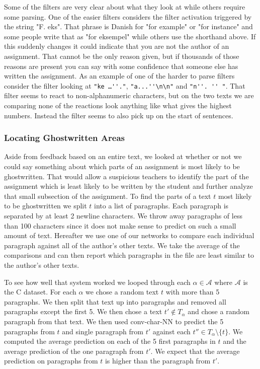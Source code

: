 Some of the filters are very clear about what they look at while others require
some parsing. One of the easier filters considers the filter activation
triggered by the string "F. eks". That phrase is Danish for "for example" or
"for instance" and some people write that as "for eksempel" while others use the
shorthand above. If this suddenly changes it could indicate that you are not the
author of an assignment. That cannot be the only reason given, but if thousands
of those reasons are present you can say with some confidence that someone else
has written the assignment. As an example of one of the harder to parse filters
consider the filter looking at \verb["ke …''."[, \verb["a...''\n\n"[ and
\verb["n''. '' "[. That filter seems to react to non-alphanumeric characters,
but on the two texts we are comparing none of the reactions look anything like
what gives the highest numbers. Instead the filter seems to also pick up on the
start of sentences.


\subsubsection{Locating Ghostwritten Areas}
\label{subsubsec:ghost_written_areas}

Aside from feedback based on an entire text, we looked at whether or not we
could say something about which parts of an assignment is most likely to be
ghostwritten. That would allow a suspicious teachers to identify the part of
the assignment which is least likely to be written by the student and further
analyze that small subsection of the assignment. To find the parts of a text
$t$ most likely to be ghostwritten we split $t$ into a list of paragraphs.
Each paragraph is separated by at least 2 newline characters. We throw away
paragraphs of less than 100 characters since it does not make sense to predict
on such a small amount of text. Hereafter we use one of our networks to compare
each individual paragraph against all of the author's other texts. We take the
average of the comparisons and can then report which paragraphs in the file are
least similar to the author's other texts.

To see how well that system worked we looped through each $\alpha \in
\mathcal{A}$ where $\mathcal{A}$ is the \gls{C} dataset. For each $\alpha$ we
chose a random text $t$ with more than 5 paragraphs. We then split that text up
into paragraphs and removed all paragraphs except the first 5. We then chose
a text $t' \not\in T_\alpha$ and chose a random paragraph from that text. We
then used \gls{conv-char-NN} to predict the 5 paragraphs from $t$ and single
paragraph from $t'$ against each $t'' \in T_\alpha \setminus \{t\}$. We computed
the average prediction on each of the 5 first paragraphs in $t$ and the average
prediction of the one paragraph from $t'$. We expect that the average prediction
on paragraphs from $t$ is higher than the paragraph from $t'$.

